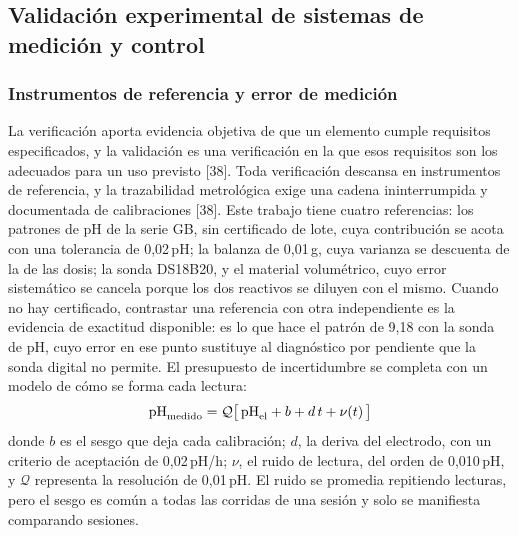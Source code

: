 \begin{figure}[H]\centering
{}
\end{figure}

\subsection{Validación experimental de sistemas de medición y control}\label{sec:validacion}

\subsubsection{Instrumentos de referencia y error de medición}\label{sec:referencias}
La verificación aporta evidencia objetiva de que un elemento cumple requisitos especificados, y la validación es una verificación en la que esos requisitos son los adecuados para un uso previsto [38]. Toda verificación descansa en instrumentos de referencia, y la trazabilidad metrológica exige una cadena ininterrumpida y documentada de calibraciones [38]. Este trabajo tiene cuatro referencias: los patrones de pH de la serie GB, sin certificado de lote, cuya contribución se acota con una tolerancia de 0,02\,pH; la balanza de 0,01\,g, cuya varianza se descuenta de la de las dosis; la sonda DS18B20, y el material volumétrico, cuyo error sistemático se cancela porque los dos reactivos se diluyen con el mismo. Cuando no hay certificado, contrastar una referencia con otra independiente es la evidencia de exactitud disponible: es lo que hace el patrón de 9,18 con la sonda de pH, cuyo error en ese punto sustituye al diagnóstico por pendiente que la sonda digital no permite. El presupuesto de incertidumbre se completa con un modelo de cómo se forma cada lectura:
\begin{equation}
\mathrm{pH}_{\text{medido}}=\mathcal Q\bigl[\,\mathrm{pH}_{\text{el}}+b+d\,t+\nu(t)\,\bigr]\label{eq:lectura}
\end{equation}
donde $b$ es el sesgo que deja cada calibración; $d$, la deriva del electrodo, con un criterio de aceptación de 0,02\,pH/h; $\nu$, el ruido de lectura, del orden de 0,010\,pH, y $\mathcal Q$ representa la resolución de 0,01\,pH. El ruido se promedia repitiendo lecturas, pero el sesgo es común a todas las corridas de una sesión y solo se manifiesta comparando sesiones.

